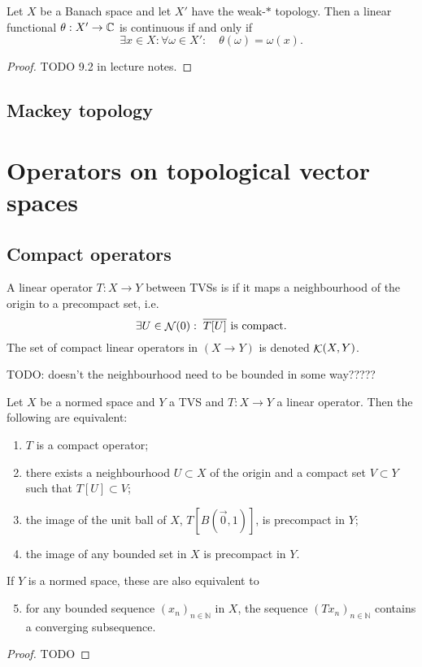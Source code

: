 \begin{proposition} \label{weak*continuousFunctional}
Let $X$ be a Banach space and let $X'$ have the weak-$*$ topology. Then a linear functional $\theta: X'\to \mathbb{C}$ is continuous \textup{if and only if}
\[ \exists x\in X: \forall \omega\in X': \quad \theta(\omega) = \omega(x). \]
\end{proposition}
\begin{proof}
TODO 9.2 in lecture notes.
\end{proof}

\subsection{Mackey topology}

\begin{theorem}
\end{theorem}

\section{Operators on topological vector spaces}
\subsection{Compact operators}
\begin{definition}
A linear operator $T:X\to Y$ between TVSs is  if it maps a neighbourhood of the origin to a precompact set, i.e.\ 
\[ \exists U \in \mathop{\mathcal{N}}(0): \;  \text{$\overline{T[U]}$ is compact.} \]
The set of compact linear operators in $(X\to Y)$ is denoted $\mathop{\mathcal{K}}(X,Y)$.
\end{definition}
TODO: doesn't the neighbourhood need to be bounded in some way?????

\begin{proposition}
Let $X$ be a normed space and $Y$ a TVS and $T:X\to Y$ a linear operator. Then the following are equivalent:
\begin{enumerate}
\item $T$ is a compact operator;
\item there exists a neighbourhood $U \subset X$ of the origin and a compact set $V\subset Y$ such that $T[U] \subset V$;
\item the image of the unit ball of $X$, $T[B(\vec{0},1)]$, is precompact in $Y$;
\item the image of any bounded set in $X$ is precompact in $Y$.
\end{enumerate}
If $Y$ is a normed space, these are also equivalent to
\begin{enumerate} \setcounter{enumi}{4}
\item for any bounded sequence $(x_{n})_{n\in \mathbb{N}}$ in $X$, the sequence $(Tx_{n})_{n\in \mathbb{N} }$ contains a converging subsequence.
\end{enumerate}
\end{proposition}
\begin{proof}
TODO
\end{proof}


